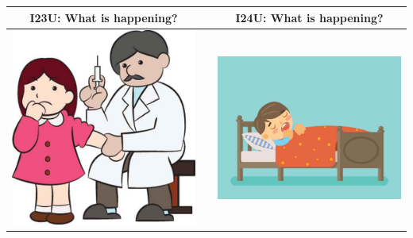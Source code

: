 \documentclass[12pt,notitlepage]{article}
\begin{document}
\begin{center}
\begin{tabular}{|c|c|c|}
\hline
I23U: What is happening? && I24U: What is happening? \\
\hline
\includegraphics[width=20em,trim=0 0 0 -3]{figures/I23.jpg} & & \includegraphics[width=20em,trim=0 0 0 -3]{figures/I24.jpg} \\
\hline
\end{tabular}
\vspace{1em} \\



\end{center}
\end{document}
